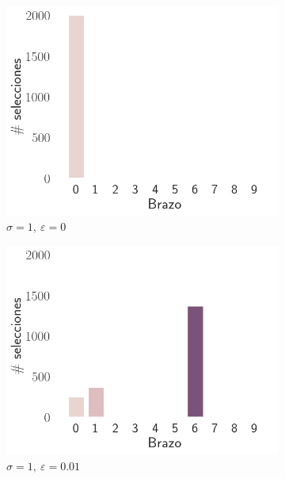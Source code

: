 \documentclass[12pt]{article}
\begin{document}
\begin{figure}[H]
        \begin{subfigure}[H]{0.3\textwidth}
            \includegraphics[width=\textwidth]{../img/2000/arm_sigma_1_epsilon_0}
            \caption{$\sigma=1 ,\ \varepsilon=0$}
            \label{fig:arms_selected_1_0}
        \end{subfigure}
        \begin{subfigure}[H]{0.3\textwidth}
            \includegraphics[width=\textwidth]{../img/2000/arm_sigma_1_epsilon_0.01}
            \caption{$\sigma=1 ,\ \varepsilon=0.01$}
            \label{fig:arms_selected_1_0.01}
        \end{subfigure}
        \begin{subfigure}[H]{0.3\textwidth}

\end{subfigure}
\end{figure}
\end{document}
